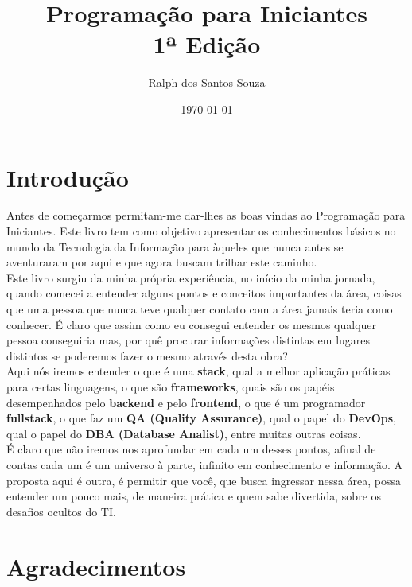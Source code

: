 \documentclass{report}
\title{Programação para Iniciantes \\ \large 1ª Edição}
\author{Ralph dos Santos Souza}
\date{\today}
\begin{document}
\maketitle

\tableofcontents

\chapter*{Introdução}
\begin{center}
    Antes de começarmos permitam-me dar-lhes as boas vindas ao Programação para Iniciantes. Este livro tem como objetivo
    apresentar os conhecimentos básicos no mundo da Tecnologia da Informação para àqueles que nunca antes se aventuraram por aqui
    e que agora buscam trilhar este caminho.\\
    \vspace{12pt}
    Este livro surgiu da minha própria experiência, no início da minha jornada, quando comecei a entender alguns pontos e conceitos
    importantes da área, coisas que uma pessoa que nunca teve qualquer contato com a área jamais teria como conhecer. 
    É claro que assim como eu consegui entender os mesmos qualquer pessoa conseguiria mas, por quê procurar informações distintas 
    em lugares distintos se poderemos fazer o mesmo através desta obra?\\
    \vspace{12pt}
    Aqui nós iremos entender o que é uma \textbf{stack}, qual a melhor aplicação práticas para certas linguagens, o que são \textbf{frameworks}, 
    quais são os papéis desempenhados pelo \textbf{backend} e pelo \textbf{frontend}, o que é um programador \textbf{fullstack}, o que faz
    um \textbf{QA (Quality Assurance)}, qual o papel do \textbf{DevOps}, qual o papel do \textbf{DBA (Database Analist)}, entre muitas outras
    coisas.\\
    \vspace{12pt}
    É claro que não iremos nos aprofundar em cada um desses pontos, afinal de contas cada um é um universo à parte, infinito em conhecimento 
    e informação. A proposta aqui é outra, é permitir que você, que busca ingressar nessa área, possa entender um pouco mais, de maneira
    prática e quem sabe divertida, sobre os desafios ocultos do TI.
\end{center}

\chapter*{Agradecimentos}
\begin{center}
    
\end{center}
\end{document}
